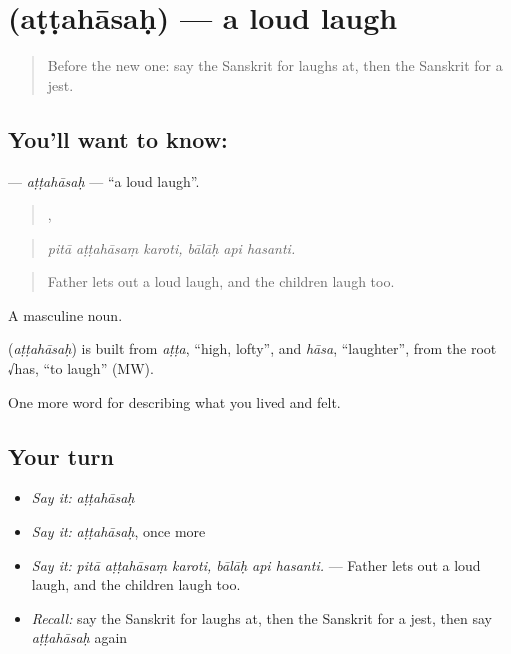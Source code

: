 \section[\texorpdfstring{\sk{अट्टहासः} (aṭṭahāsaḥ)}{अट्टहासः (aṭṭahāsaḥ)}]{ (aṭṭahāsaḥ) — a loud laugh}

\label{lesson:SA-C457-attahasah}



\begin{quote}
Before the new one: say the Sanskrit for laughs at, then the Sanskrit for a jest.
\end{quote}

\subsection*{You'll want to know: }
\textbf{} — \emph{aṭṭahāsaḥ} — \textquotedblleft{}a loud laugh\textquotedblright{}.

\begin{quote}
  ,   
\end{quote}

\begin{quote}
\emph{pitā aṭṭahāsaṃ karoti, bālāḥ api hasanti.}
\end{quote}

\begin{quote}
Father lets out a loud laugh, and the children laugh too.
\end{quote}

A masculine noun.

\begin{cousinweb}
\textbf{} (\emph{aṭṭahāsaḥ}) is built from \emph{aṭṭa}, \textquotedblleft{}high, lofty\textquotedblright{}, and \emph{hāsa}, \textquotedblleft{}laughter\textquotedblright{}, from the root √has, \textquotedblleft{}to laugh\textquotedblright{} (MW).
\end{cousinweb}

\begin{grammarlens}[title={What you've built}]
One more word for describing what you lived and felt.
\end{grammarlens}

\subsection*{Your turn}
\begin{itemize}
\raggedright
  \item \emph{Say it:} \emph{aṭṭahāsaḥ}
  \item \emph{Say it:} \emph{aṭṭahāsaḥ}, once more
  \item \emph{Say it:} \emph{pitā aṭṭahāsaṃ karoti, bālāḥ api hasanti.} — Father lets out a loud laugh, and the children laugh too.
  \item \emph{Recall:} say the Sanskrit for laughs at, then the Sanskrit for a jest, then say \emph{aṭṭahāsaḥ} again
\end{itemize}

